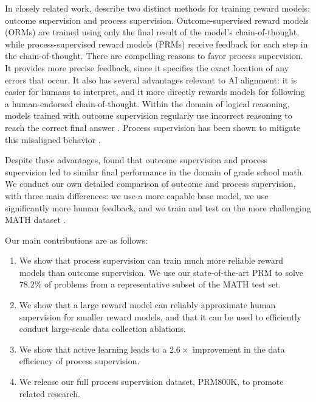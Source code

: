 In closely related work, \cite{uesato2022solving} describe two distinct methods for training reward models: outcome supervision and process supervision. Outcome-supervised reward models (ORMs) are trained using only the final result of the model's chain-of-thought, while process-supervised reward models (PRMs) receive feedback for each step in the chain-of-thought. There are compelling reasons to favor process supervision. It provides more precise feedback, since it specifies the exact location of any errors that occur. It also has several advantages relevant to AI alignment: it is easier for humans to interpret, and it more directly rewards models for following a human-endorsed chain-of-thought. Within the domain of logical reasoning, models trained with outcome supervision regularly use incorrect reasoning to reach the correct final answer \citep{zelikman2022star, creswell2022selection}. Process supervision has been shown to mitigate this misaligned behavior \citep{uesato2022solving}.

Despite these advantages, \cite{uesato2022solving} found that outcome supervision and process supervision led to similar final performance in the domain of grade school math. We conduct our own detailed comparison of outcome and process supervision, with three main differences: we use a more capable base model, we use significantly more human feedback, and we train and test on the more challenging MATH dataset \citep{hendrycks2021measuring}.

Our main contributions are as follows:

\begin{enumerate}
\item We show that process supervision can train much more reliable reward models than outcome supervision. We use our state-of-the-art PRM to solve $78.2\%$ of problems from a representative subset of the MATH test set.

\item We show that a large reward model can reliably approximate human supervision for smaller reward models, and that it can be used to efficiently conduct large-scale data collection ablations.

\item We show that active learning leads to a $2.6\times$ improvement in the data efficiency of process supervision.

\item We release our full process supervision dataset, PRM800K, to promote related research.

\end{enumerate}

